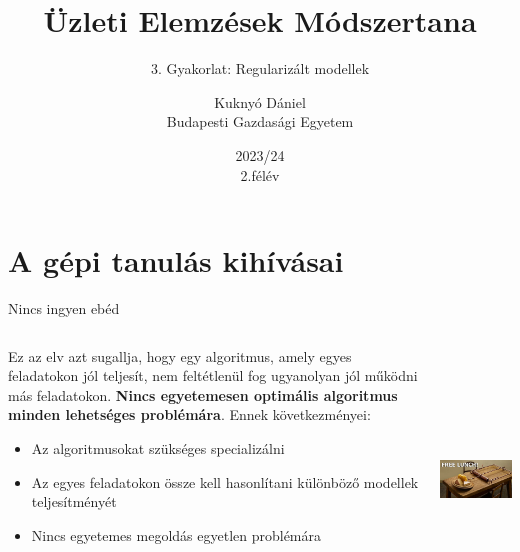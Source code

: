 \documentclass[english, aspectratio=169]{beamer}
\makeatletter
\newcommand\makebeamertitle{\frame{\maketitle}}
\let\origtableofcontents=\tableofcontents
\def\tableofcontents{\@ifnextchar[{\origtableofcontents}{\gobbletableofcontents}}
\def\gobbletableofcontents#1{\origtableofcontents}
\makeatother
\begin{document}
\section{A gépi tanulás kihívásai}
\title[]{Üzleti Elemzések Módszertana}
\subtitle{3. Gyakorlat: Regularizált modellek}
\author[Kuknyó Dániel]{Kuknyó Dániel\\Budapesti Gazdasági Egyetem}
\date{2023/24\\2.félév}
\makebeamertitle

\begin{frame}
\tableofcontents{}
\end{frame}

\begin{frame}
\tableofcontents[currentsection]
\end{frame}

\begin{frame}{Nincs ingyen ebéd}
\begin{columns}
\begin{column}{.5\textwidth}
Ez az elv azt sugallja, hogy egy algoritmus, amely egyes feladatokon jól teljesít, nem feltétlenül fog ugyanolyan jól működni más feladatokon. \textbf{Nincs egyetemesen optimális algoritmus minden lehetséges problémára}. Ennek következményei:
\begin{itemize}
	\item Az algoritmusokat szükséges specializálni
	\item Az egyes feladatokon össze kell hasonlítani különböző modellek teljesítményét
	\item Nincs egyetemes megoldás egyetlen problémára
\end{itemize}
\end{column}
\begin{column}{.5\textwidth}
\begin{center}
\includegraphics[width=7cm, height=7cm, keepaspectratio]{images/regularization_1.png}
\end{center}
\end{column}
\end{columns}
\end{frame}
\end{document}
